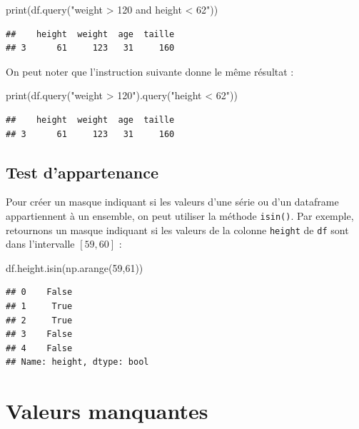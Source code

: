 \documentclass[
  12pt,
]{book}
\newenvironment{Shaded}{\begin{snugshade}}{\end{snugshade}}
\newcommand{\BuiltInTok}[1]{#1}
\newcommand{\DecValTok}[1]{\textcolor[rgb]{0.00,0.00,0.81}{#1}}
\newcommand{\NormalTok}[1]{#1}
\newcommand{\StringTok}[1]{\textcolor[rgb]{0.31,0.60,0.02}{#1}}
\numberwithin{equation}{section}
\numberwithin{countremarque}{section}
\begin{document}
\begin{Shaded}
\begin{Highlighting}[]
\BuiltInTok{print}\NormalTok{(df.query(}\StringTok{"weight \textgreater{} 120 and height \textless{} 62"}\NormalTok{))}
\end{Highlighting}
\end{Shaded}

\begin{lstlisting}
##    height  weight  age  taille
## 3      61     123   31     160
\end{lstlisting}

On peut noter que l'instruction suivante donne le même résultat :

\begin{Shaded}
\begin{Highlighting}[]
\BuiltInTok{print}\NormalTok{(df.query(}\StringTok{"weight \textgreater{} 120"}\NormalTok{).query(}\StringTok{"height \textless{} 62"}\NormalTok{))}
\end{Highlighting}
\end{Shaded}

\begin{lstlisting}
##    height  weight  age  taille
## 3      61     123   31     160
\end{lstlisting}

\subsection{Test d'appartenance}\label{test-dappartenance-2}

Pour créer un masque indiquant si les valeurs d'une série ou d'un dataframe appartiennent à un ensemble, on peut utiliser la méthode \texttt{isin()}. Par exemple, retournons un masque indiquant si les valeurs de la colonne \texttt{height} de \texttt{df} sont dans l'intervalle \([59,60]\) :

\begin{Shaded}
\begin{Highlighting}[]
\NormalTok{df.height.isin(np.arange(}\DecValTok{59}\NormalTok{,}\DecValTok{61}\NormalTok{))}
\end{Highlighting}
\end{Shaded}

\begin{lstlisting}
## 0    False
## 1     True
## 2     True
## 3    False
## 4    False
## Name: height, dtype: bool
\end{lstlisting}

\section{Valeurs manquantes}\label{valeurs-manquantes}
\end{document}
